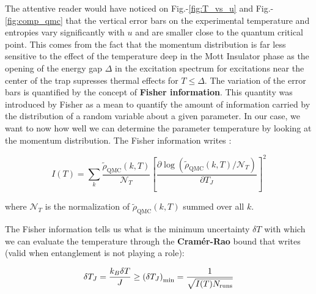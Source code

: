 The attentive reader would have noticed on Fig.-\ref{fig:T_vs_u} and Fig.-\ref{fig:comp_qmc} that the vertical error bars on the experimental temperature and entropies vary significantly with $u$ and are smaller close to the quantum critical point. This comes from the fact that the momentum distribution is far less sensitive to the effect of the temperature deep in the Mott Insulator phase as the opening of the energy gap $\Delta$ in the excitation spectrum for excitations near the center of the trap supresses thermal effects for $T \leq \Delta$. The variation of the error bars is quantified by the concept of \textbf{Fisher information}. This quantity was introduced by Fisher \cite{fisher1922mathematical} as a mean to quantify the amount of information carried by the distribution of a random variable about a given parameter. In our case, we want to now how well we can determine the parameter temperature by looking at the momentum distribution. The Fisher information writes \cite{van2007parameter}:

\begin{equation}
    I(T)=\sum_{k} \frac{\tilde{\rho}_{\mathrm{QMC}}(k, T)}{\mathcal{N}_{T}}\left[\frac{\partial \log \left(\tilde{\rho}_{\mathrm{QMC}}(k, T) / \mathcal{N}_{T}\right)}{\partial T_{J}}\right]^{2}
\end{equation}



\noindent where $\mathcal{N}_{T}$ is the normalization of $\tilde{\rho}_{\mathrm{QMC}}(k, T)$ summed over all $k$.

The Fisher information tells us what is the minimum uncertainty $\delta T$ with which we can evaluate the temperature through the \textbf{Cramér-Rao} bound that writes (valid when entanglement is not playing a role):

\begin{equation}
    \delta T_{J}=\frac{k_{B} \delta T}{J} \geq\left(\delta T_{J}\right)_{\min }=\frac{1}{\sqrt{I(T) N_{\rm{runs}}}}
\end{equation}

